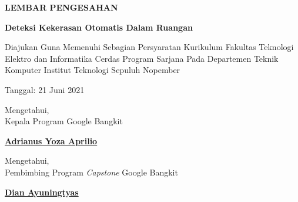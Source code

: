 \begin{center}
  {\Large \textbf{LEMBAR PENGESAHAN}}
  \vspace{6ex}


  {\large \textbf{Deteksi Kekerasan Otomatis Dalam Ruangan}}
  \vspace{6ex}

  Diajukan Guna Memenuhi Sebagian Persyaratan Kurikulum Fakultas Teknologi Elektro dan Informatika Cerdas Program Sarjana Pada Departemen Teknik Komputer Institut Teknologi Sepuluh Nopember
  \vspace{2ex}

  Tanggal: 21 Juni 2021

  \vspace{8ex}

  Mengetahui, \\
  Kepala Program Google Bangkit
  \vspace{12ex}

  \textbf{\underline{Adrianus Yoza Aprilio}}
  \vspace{8ex}

  Mengetahui, \\
  Pembimbing Program \textit{Capstone} Google Bangkit
  \vspace{12ex}

  \textbf{\underline{Dian Ayuningtyas}}

  \vspace{8ex}

\end{center}

